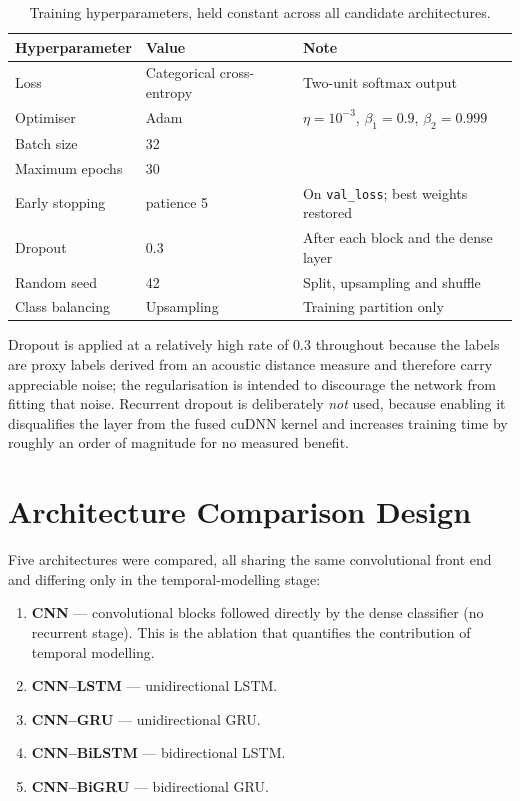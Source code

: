 \begin{table}[H]
\centering
\caption[Training hyperparameters]{Training hyperparameters, held constant
across all candidate architectures.}
\label{tab:hyperparams}
\small
\begin{tabular}{@{}llp{5.2cm}@{}}
\toprule
\textbf{Hyperparameter} & \textbf{Value} & \textbf{Note} \\
\midrule
Loss                 & Categorical cross-entropy & Two-unit softmax output \\
Optimiser            & Adam                      & $\eta = 10^{-3}$, $\beta_1 = 0.9$, $\beta_2 = 0.999$ \\
Batch size           & 32                        & \\
Maximum epochs       & 30                        & \\
Early stopping       & patience 5                & On \texttt{val\_loss}; best weights restored \\
Dropout              & 0.3                       & After each block and the dense layer \\
Random seed          & 42                        & Split, upsampling and shuffle \\
Class balancing      & Upsampling                & Training partition only \\
\bottomrule
\end{tabular}
\end{table}

Dropout is applied at a relatively high rate of $0.3$ throughout because the
labels are proxy labels derived from an acoustic distance measure and therefore
carry appreciable noise; the regularisation is intended to discourage the
network from fitting that noise. Recurrent dropout is deliberately \emph{not}
used, because enabling it disqualifies the layer from the fused cuDNN kernel and
increases training time by roughly an order of magnitude for no measured
benefit.

\section{Architecture Comparison Design}
\label{sec:arch-design}

Five architectures were compared, all sharing the same convolutional front end
and differing only in the temporal-modelling stage:

\begin{enumerate}[leftmargin=*]
  \item \textbf{CNN} --- convolutional blocks followed directly by the dense
        classifier (no recurrent stage). This is the ablation that quantifies
        the contribution of temporal modelling.
  \item \textbf{CNN--LSTM} --- unidirectional LSTM.
  \item \textbf{CNN--GRU} --- unidirectional GRU.
  \item \textbf{CNN--BiLSTM} --- bidirectional LSTM.
  \item \textbf{CNN--BiGRU} --- bidirectional GRU.
\end{enumerate}

